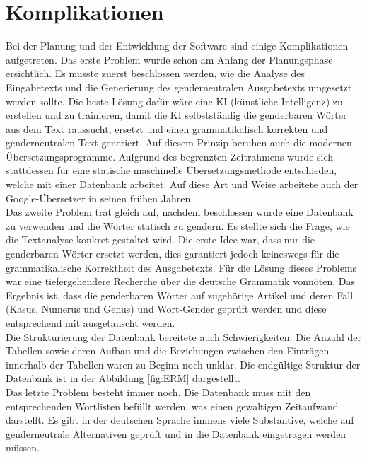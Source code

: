 \documentclass[paper=a4, parskip=half]{scrreprt}
\begin{document}
\chapter{Komplikationen}
Bei der Planung und der Entwicklung der Software sind einige Komplikationen aufgetreten.
Das erste Problem wurde schon am Anfang der Planungsphase ersichtlich. Es musste zuerst beschlossen werden, wie die Analyse des Eingabetexts und die Generierung des genderneutralen Ausgabetexts umgesetzt werden sollte. Die beste Lösung dafür wäre eine KI (künstliche Intelligenz) zu erstellen und zu trainieren, damit die KI selbstständig die genderbaren Wörter aus dem Text raussucht, ersetzt und einen grammatikalisch korrekten und genderneutralen Text generiert. Auf diesem Prinzip beruhen auch die modernen Übersetzungsprogramme. Aufgrund des begrenzten Zeitrahmens wurde sich stattdessen für eine statische maschinelle Übersetzungsmethode entschieden, welche mit einer Datenbank arbeitet. Auf diese Art und Weise arbeitete auch der Google-Übersetzer in seinen frühen Jahren. \\
Das zweite Problem trat gleich auf, nachdem beschlossen wurde eine Datenbank zu verwenden und die Wörter statisch zu gendern. Es  stellte sich die Frage, wie die Textanalyse konkret gestaltet wird. Die erste Idee war, dass nur die genderbaren Wörter ersetzt werden, dies garantiert jedoch keineswegs für die grammatikalische Korrektheit des Ausgabetexts. Für die Lösung dieses Problems war eine tiefergehendere Recherche über die deutsche Grammatik vonnöten. Das Ergebnis ist, dass die genderbaren Wörter auf zugehörige Artikel und deren Fall (Kasus, Numerus und Genus) und Wort-Gender geprüft werden und diese entsprechend mit ausgetauscht werden. \\
Die Strukturierung der Datenbank bereitete auch Schwierigkeiten. Die Anzahl der Tabellen sowie deren Aufbau und die Beziehungen zwischen den Einträgen innerhalb der Tabellen waren zu Beginn noch unklar. Die endgültige Struktur der Datenbank ist in der Abbildung \ref{fig:ERM} dargestellt. \\
Das letzte Problem besteht immer noch. Die Datenbank muss mit den entsprechenden Wortlisten befüllt werden, was einen gewaltigen Zeitaufwand darstellt. Es gibt in der deutschen Sprache immens viele Substantive, welche auf genderneutrale Alternativen geprüft und in die Datenbank eingetragen werden müssen.
\end{document}
